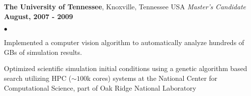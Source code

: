 \documentclass[margin,line, 11pt]{res}
\newenvironment{list2}{
  \begin{list}{$\bullet$}{%
      \setlength{\itemsep}{0in}
      \setlength{\parsep}{0in} \setlength{\parskip}{0in}
      \setlength{\topsep}{0in} \setlength{\partopsep}{0in}
      \setlength{\leftmargin}{0.2in}}}{\end{list}}
\begin{document}
\begin{resume}
\textbf{The University of Tennessee}, Knoxville, Tennessee USA\newline
\textit{Master's Candidate} \hfill \textbf{August, 2007 - 2009}\newline
    \begin{list2}
    	\vspace*{-5mm}
      \item Implemented a computer vision algorithm to automatically analyze hundreds of GBs of simulation results.
      \item Optimized scientific simulation initial conditions using a genetic algorithm based search utilizing HPC ($\sim100$k cores) systems at the National Center for Computational Science, part of Oak Ridge National Laboratory
    \end{list2}
\vspace*{-4mm}

\end{resume}
\end{document}
